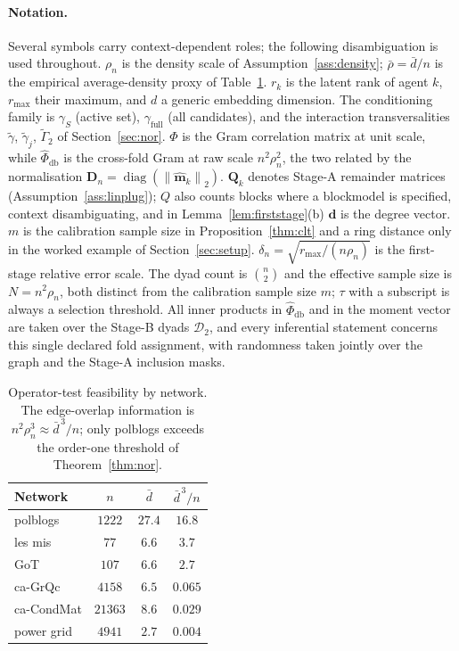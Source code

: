 \documentclass[12pt]{article}
\newcommand{\1}{\mathbf{1}}
\newcommand{\norm}[1]{\left\lVert#1\right\rVert}
\DeclareMathOperator{\diag}{diag}
\begin{document}
\paragraph{Notation.} Several symbols carry context-dependent roles; the following disambiguation is
used throughout. $\rho_n$ is the density scale of Assumption~\ref{ass:density}; $\bar\rho=\bar d/n$
is the empirical average-density proxy of Table~\ref{tab:opfeas}. $r_k$ is the latent rank of agent
$k$, $r_{\max}$ their maximum, and $d$ a generic embedding dimension. The conditioning family is
$\gamma_S$ (active set), $\gamma_{\mathrm{full}}$ (all candidates), and the interaction transversalities
$\widetilde\gamma$, $\widetilde\gamma_j$, $\widetilde\Gamma_2$ of Section~\ref{sec:nor}. $\Phi$
is the Gram correlation matrix at unit scale, while $\widehat\Phi_{\mathrm{db}}$ is the cross-fold
Gram at raw scale $n^2\rho_n^2$, the two related by the normalisation $\mathbf
D_n=\diag(\norm{\widehat{\mathbf m}_k}_2)$. $\mathbf Q_k$ denotes Stage-A remainder matrices
(Assumption~\ref{ass:linplug}); $Q$ also counts blocks where a blockmodel is specified, context
disambiguating, and in Lemma~\ref{lem:firststage}(b) $\mathbf d$ is the degree vector. $m$ is the calibration sample size in Proposition~\ref{thm:clt} and a ring
distance only in the worked example of Section~\ref{sec:setup}. $\delta_n=\sqrt{r_{\max}/(n\rho_n)}$
is the first-stage relative error scale. The dyad count is $\binom n2$ and the effective sample size is $N=n^2\rho_n$, both distinct from the calibration sample size $m$; $\tau$ with a subscript is always a selection threshold.
All inner products in $\widehat\Phi_{\mathrm{db}}$ and in the moment vector are taken over the
Stage-B dyads $\mathcal D_2$, and every inferential statement concerns this single declared fold assignment, with randomness
taken jointly over the graph and the Stage-A inclusion masks.

\begin{table}[t]
\centering
\small
\caption{Operator-test feasibility by network. The edge-overlap information is $n^2\rho_n^3\approx\bar d^{\,3}/n$; only \textsf{polblogs} exceeds the order-one threshold of Theorem~\ref{thm:nor}.}
\label{tab:opfeas}
\begin{tabular}{lccc}
\toprule
Network & $n$ & $\bar d$ & $\bar d^{\,3}/n$\\
\midrule
\textsf{polblogs}   & $1222$  & $27.4$ & $16.8$\\
\textsf{les mis}    & $77$    & $6.6$  & $3.7$\\
\textsf{GoT}        & $107$   & $6.6$  & $2.7$\\
\textsf{ca-GrQc}    & $4158$  & $6.5$  & $0.065$\\
\textsf{ca-CondMat} & $21363$ & $8.6$  & $0.029$\\
power grid          & $4941$  & $2.7$  & $0.004$\\
\bottomrule
\end{tabular}
\end{table}
\end{document}
